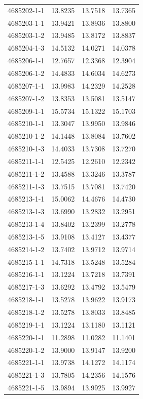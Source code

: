 \begin{longtable}{lrrr}
4685202-1-1 & 13.8235 & 13.7518 & 13.7365 \\
4685203-1-1 & 13.9421 & 13.8936 & 13.8800 \\
4685203-1-2 & 13.9485 & 13.8172 & 13.8837 \\
4685204-1-3 & 14.5132 & 14.0271 & 14.0378 \\
4685206-1-1 & 12.7657 & 12.3368 & 12.3904 \\
4685206-1-2 & 14.4833 & 14.6034 & 14.6273 \\
4685207-1-1 & 13.9983 & 14.2329 & 14.2528 \\
4685207-1-2 & 13.8353 & 13.5081 & 13.5147 \\
4685209-1-1 & 15.5734 & 15.1322 & 15.1703 \\
4685210-1-1 & 13.3047 & 13.9950 & 13.9846 \\
4685210-1-2 & 14.1448 & 13.8084 & 13.7602 \\
4685210-1-3 & 14.4033 & 13.7308 & 13.7270 \\
4685211-1-1 & 12.5425 & 12.2610 & 12.2342 \\
4685211-1-2 & 13.4588 & 13.3246 & 13.3787 \\
4685211-1-3 & 13.7515 & 13.7081 & 13.7420 \\
4685213-1-1 & 15.0062 & 14.4676 & 14.4730 \\
4685213-1-3 & 13.6990 & 13.2832 & 13.2951 \\
4685213-1-4 & 13.8402 & 13.2399 & 13.2778 \\
4685213-1-5 & 13.9108 & 13.4127 & 13.4377 \\
4685214-1-2 & 13.7402 & 13.9712 & 13.9714 \\
4685215-1-1 & 14.7318 & 13.5248 & 13.5284 \\
4685216-1-1 & 13.1224 & 13.7218 & 13.7391 \\
4685217-1-3 & 13.6292 & 13.4792 & 13.5479 \\
4685218-1-1 & 13.5278 & 13.9622 & 13.9173 \\
4685218-1-2 & 13.5278 & 13.8033 & 13.8485 \\
4685219-1-1 & 13.1224 & 13.1180 & 13.1121 \\
4685220-1-1 & 11.2898 & 11.0282 & 11.1401 \\
4685220-1-2 & 13.9000 & 13.9147 & 13.9200 \\
4685221-1-1 & 13.9738 & 14.1272 & 14.1174 \\
4685221-1-3 & 13.7805 & 14.2356 & 14.1576 \\
4685221-1-5 & 13.9894 & 13.9925 & 13.9927 \\

\end{longtable}
